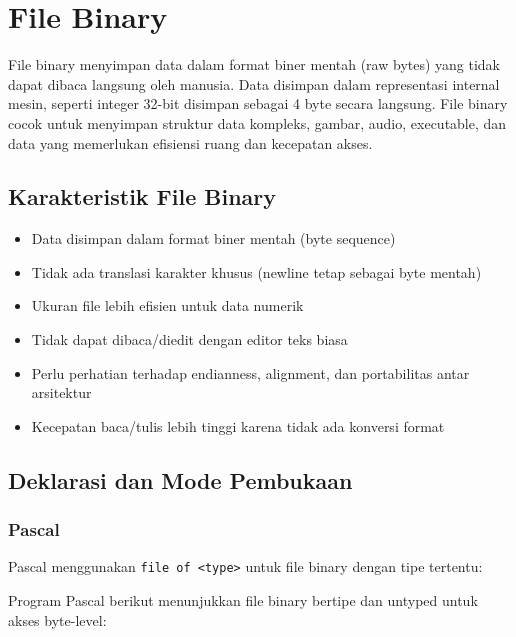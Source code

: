 \documentclass[../main.tex]{subfiles}
\begin{document}
\section{File Binary}

File binary menyimpan data dalam format biner mentah (raw bytes) yang tidak dapat dibaca langsung oleh manusia. Data disimpan dalam representasi internal mesin, seperti integer 32-bit disimpan sebagai 4 byte secara langsung. File binary cocok untuk menyimpan struktur data kompleks, gambar, audio, executable, dan data yang memerlukan efisiensi ruang dan kecepatan akses.

\subsection{Karakteristik File Binary}
\begin{itemize}
  \item Data disimpan dalam format biner mentah (byte sequence)
  \item Tidak ada translasi karakter khusus (newline tetap sebagai byte mentah)
  \item Ukuran file lebih efisien untuk data numerik
  \item Tidak dapat dibaca/diedit dengan editor teks biasa
  \item Perlu perhatian terhadap endianness, alignment, dan portabilitas antar arsitektur
  \item Kecepatan baca/tulis lebih tinggi karena tidak ada konversi format
\end{itemize}

\subsection{Deklarasi dan Mode Pembukaan}

\subsubsection{Pascal}
Pascal menggunakan \texttt{file of <type>} untuk file binary dengan tipe tertentu:

Program Pascal berikut menunjukkan file binary bertipe dan untyped untuk akses byte-level:
\end{document}
